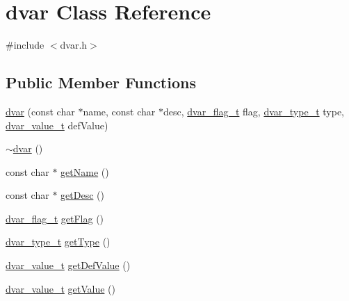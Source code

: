 \hypertarget{classdvar}{\section{dvar Class Reference}
\label{classdvar}
}


{\ttfamily \#include $<$dvar.\-h$>$}

\subsection*{Public Member Functions}
\begin{DoxyCompactItemize}
\item 
\hyperlink{classdvar_a88e8bd450e4c20378ffa609ccc17d670}{dvar} (const char $\ast$name, const char $\ast$desc, \hyperlink{dvar_8h_aefe39e0c960d504f76ed45445d970ee2}{dvar\-\_\-flag\-\_\-t} flag, \hyperlink{dvar_8h_a6a293e15d732e8bd2b0857ea14ebdaab}{dvar\-\_\-type\-\_\-t} type, \hyperlink{dvar_8h_a2dc7f3ad6d1f06950e9db0cc3813e0f7}{dvar\-\_\-value\-\_\-t} def\-Value)
\item 
\hyperlink{classdvar_a9bd559538b24f50c1b144b1f3d90c1e3}{$\sim$dvar} ()
\item 
const char $\ast$ \hyperlink{classdvar_acdbc88deb5a7d6367a50a21f897307b6}{get\-Name} ()
\item 
const char $\ast$ \hyperlink{classdvar_aa86e31b99dbb05d6b1a4e6f91e5d20e2}{get\-Desc} ()
\item 
\hyperlink{dvar_8h_aefe39e0c960d504f76ed45445d970ee2}{dvar\-\_\-flag\-\_\-t} \hyperlink{classdvar_ad4e55f7a455e12518b65bf762252cfc8}{get\-Flag} ()
\item 
\hyperlink{dvar_8h_a6a293e15d732e8bd2b0857ea14ebdaab}{dvar\-\_\-type\-\_\-t} \hyperlink{classdvar_a821e1e03c7557b73058b277d3beeb026}{get\-Type} ()
\item 
\hyperlink{dvar_8h_a2dc7f3ad6d1f06950e9db0cc3813e0f7}{dvar\-\_\-value\-\_\-t} \hyperlink{classdvar_a8254f32e9b4584de927129f2638f4cd5}{get\-Def\-Value} ()
\item 
\hyperlink{dvar_8h_a2dc7f3ad6d1f06950e9db0cc3813e0f7}{dvar\-\_\-value\-\_\-t} \hyperlink{classdvar_a8b8b447cd923a5b4aac1fcc1631fa4ab}{get\-Value} ()
\end{DoxyCompactItemize}


